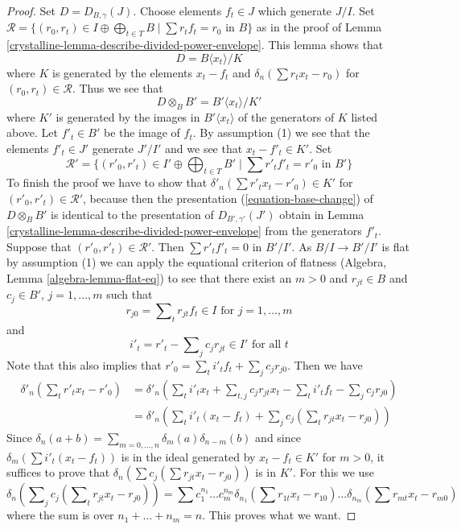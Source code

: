 \begin{proof}

Set $D = D_{B, \gamma}(J)$. Choose elements $f_t \in J$ which generate $J/I$.
Set $\mathcal{R} = \{(r_0, r_t) \in I \oplus \bigoplus\nolimits_{t \in T} B
\mid \sum r_t f_t = r_0 \text{ in }B\}$ as in the proof of
Lemma \ref{crystalline-lemma-describe-divided-power-envelope}. This lemma shows that
$$
D = B\langle x_t \rangle/ K
$$
where $K$ is generated by the elements $x_t - f_t$ and
$\delta_n(\sum r_t x_t - r_0)$ for $(r_0, r_t) \in \mathcal{R}$.
Thus we see that
\begin{equation}
\label{equation-base-change}
D \otimes_B B' = B'\langle x_t \rangle/K'
\end{equation}
where $K'$ is generated by the images in $B'\langle x_t \rangle$
of the generators of $K$ listed above. Let $f'_t \in B'$ be the image
of $f_t$. By assumption (1) we see that the elements $f'_t \in J'$
generate $J'/I'$ and we see that $x_t - f'_t \in K'$. Set
$$
\mathcal{R}' =
\{(r'_0, r'_t) \in I' \oplus \bigoplus\nolimits_{t \in T} B'
\mid \sum r'_t f'_t = r'_0 \text{ in }B'\}
$$
To finish the proof we have to show that
$\delta'_n(\sum r'_t x_t - r'_0) \in K'$ for
$(r'_0, r'_t) \in \mathcal{R}'$, because then the presentation
(\ref{equation-base-change}) of $D \otimes_B B'$ is identical
to the presentation of $D_{B', \gamma'}(J')$ obtain in
Lemma \ref{crystalline-lemma-describe-divided-power-envelope} from the generators $f'_t$.
Suppose that $(r'_0, r'_t) \in \mathcal{R}'$. Then
$\sum r'_t f'_t = 0$ in $B'/I'$. As $B/I \to B'/I'$ is flat by
assumption (1) we can apply the equational criterion of flatness
(Algebra, Lemma \ref{algebra-lemma-flat-eq}) to see
that there exist an $m > 0$ and
$r_{jt} \in B$ and $c_j \in B'$, $j = 1, \ldots, m$ such
that
$$
r_{j0} = \sum\nolimits_t r_{jt} f_t  \in I \text{ for } j = 1, \ldots, m
$$
and
$$
i'_t  = r'_t - \sum\nolimits_j c_j r_{jt} \in I' \text{ for all }t
$$
Note that this also implies that
$r'_0 = \sum_t i'_t f_t + \sum_j c_j r_{j0}$.
Then we have
\begin{align*}
\delta'_n(\sum\nolimits_t r'_t x_t  - r'_0)
& =
\delta'_n(
\sum\nolimits_t i'_t x_t +
\sum\nolimits_{t, j} c_j r_{jt} x_t -
\sum\nolimits_t i'_t f_t -
\sum\nolimits_j c_j r_{j0}) \\
& =
\delta'_n(
\sum\nolimits_t i'_t(x_t - f_t) +
\sum\nolimits_j c_j (\sum\nolimits_t r_{jt} x_t  - r_{j0}))
\end{align*}
Since $\delta_n(a + b) = \sum_{m = 0, \ldots, n} \delta_m(a) \delta_{n - m}(b)$
and since $\delta_m(\sum i'_t(x_t - f_t))$ is in the ideal
generated by $x_t - f_t \in K'$ for $m > 0$, it suffices to prove that
$\delta_n(\sum c_j (\sum r_{jt} x_t  - r_{j0}))$ is in $K'$.
For this we use
$$
\delta_n(\sum\nolimits_j c_j (\sum\nolimits_t r_{jt} x_t  - r_{j0}))
=
\sum c_1^{n_1} \ldots c_m^{n_m}
\delta_{n_1}(\sum r_{1t} x_t  - r_{10}) \ldots
\delta_{n_m}(\sum r_{mt} x_t  - r_{m0})
$$
where the sum is over $n_1 + \ldots + n_m = n$. This proves what we want.
\end{proof}

